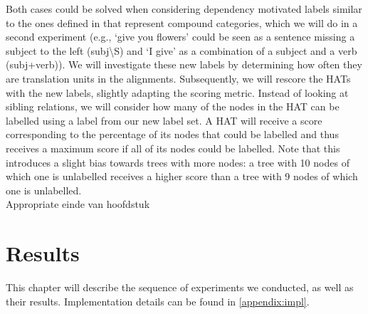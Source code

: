 \documentclass{report}
\theoremstyle{definition}
\theoremstyle{plain}
\begin{document}
Both cases could be solved when considering dependency motivated labels similar to the ones defined in \cite{zollmann2006syntax} that represent compound categories, which we will do in a second experiment (e.g., `give you flowers' could be seen as a sentence missing a subject to the left (subj\textbackslash S) and `I give' as a combination of a subject and a verb (subj+verb)). We will investigate these new labels by determining how often they are translation units in the alignments. Subsequently, we will rescore the HATs with the new labels, slightly adapting the scoring metric. Instead of looking at sibling relations, we will consider how many of the nodes in the HAT can be labelled using a label from our new label set. A HAT will receive a score corresponding to the percentage of its nodes that could be labelled and thus receives a maximum score if all of its nodes could be labelled. Note that this introduces a slight bias towards trees with more nodes: a tree with 10 nodes of which one is unlabelled receives a higher score than a tree with 9 nodes of which one is unlabelled.\\
Appropriate einde van hoofdstuk%




%
%


\chapter{Results}

This chapter will describe the sequence of experiments we conducted, as well as their results. Implementation details can be found in \ref{appendix:impl}. 




\end{document}
